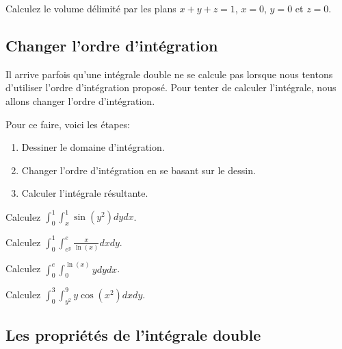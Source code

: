 \documentclass[]{book}
\theoremstyle{definition}
\theoremstyle{definition}
\theoremstyle{definition}
\theoremstyle{remark}
\let\BeginKnitrBlock\begin \let\EndKnitrBlock\end
\begin{document}
\BeginKnitrBlock{example}
\protect\hypertarget{exm:unnamed-chunk-249}{}{\label{exm:unnamed-chunk-249}
}Calculez le volume délimité par les plans \(x+y+z=1\), \(x=0\), \(y=0\)
et \(z=0\).
\EndKnitrBlock{example}
\vspace*{8cm}

\hypertarget{changer-lordre-dintegration}{%
\subsection{Changer l'ordre
d'intégration}\label{changer-lordre-dintegration}}

Il arrive parfois qu'une intégrale double ne se calcule pas lorsque nous
tentons d'utiliser l'ordre d'intégration proposé. Pour tenter de
calculer l'intégrale, nous allons changer l'ordre d'intégration.

Pour ce faire, voici les étapes:

\begin{enumerate}
\def\labelenumi{\arabic{enumi}.}
\item
  Dessiner le domaine d'intégration.
\item
  Changer l'ordre d'intégration en se basant sur le dessin.
\item
  Calculer l'intégrale résultante.
\end{enumerate}

\BeginKnitrBlock{example}
\protect\hypertarget{exm:unnamed-chunk-250}{}{\label{exm:unnamed-chunk-250}
}Calculez \(\int_0^1\int_x^1 \sin(y^2)dydx\).
\EndKnitrBlock{example}
\vspace*{8cm}

\BeginKnitrBlock{example}
\protect\hypertarget{exm:unnamed-chunk-251}{}{\label{exm:unnamed-chunk-251}
}Calculez \(\int_0^1\int_{e^y}^e \frac{x}{\ln(x)}dxdy\).
\EndKnitrBlock{example}
\vspace*{8cm}

\BeginKnitrBlock{example}
\protect\hypertarget{exm:unnamed-chunk-252}{}{\label{exm:unnamed-chunk-252}
}Calculez \(\int_0^e\int_{0}^{\ln(x)} ydydx\).
\EndKnitrBlock{example}
\vspace*{8cm}

\BeginKnitrBlock{example}
\protect\hypertarget{exm:unnamed-chunk-253}{}{\label{exm:unnamed-chunk-253}
}Calculez \(\int_0^3\int_{y^2}^{9} y\cos(x^2)dxdy\).
\EndKnitrBlock{example}
\vspace*{8cm}

\hypertarget{les-proprietes-de-lintegrale-double}{%
\subsection{Les propriétés de l'intégrale
double}\label{les-proprietes-de-lintegrale-double}}
\end{document}
